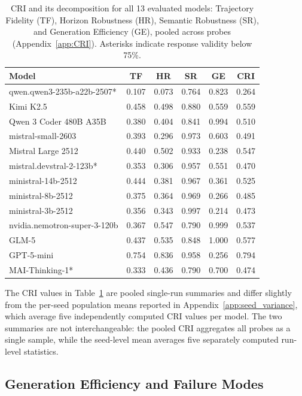 \documentclass{article}
\begin{document}
\begin{table}[!ht]
\centering
\caption{CRI and its decomposition for all 13 evaluated models: Trajectory Fidelity (TF), Horizon Robustness (HR), Semantic Robustness (SR), and Generation Efficiency (GE), pooled across probes (Appendix~\ref{app:CRI}). Asterisks indicate response validity below 75\%.}
\label{tab:cri_decomposition}
\scriptsize
\begin{tabular}{lccccc}
\toprule
\textbf{Model} & \textbf{TF} & \textbf{HR} & \textbf{SR} & \textbf{GE} & \textbf{CRI} \\
\midrule
qwen.qwen3-235b-a22b-2507* & 0.107 & 0.073 & 0.764 & 0.823 & 0.264 \\
Kimi K2.5 & 0.458 & 0.498 & 0.880 & 0.559 & 0.559 \\
Qwen 3 Coder 480B A35B & 0.380 & 0.404 & 0.841 & 0.994 & 0.510 \\
mistral-small-2603 & 0.393 & 0.296 & 0.973 & 0.603 & 0.491 \\
Mistral Large 2512 & 0.440 & 0.502 & 0.933 & 0.238 & 0.547 \\
mistral.devstral-2-123b* & 0.353 & 0.306 & 0.957 & 0.551 & 0.470 \\
ministral-14b-2512 & 0.444 & 0.381 & 0.967 & 0.361 & 0.525 \\
ministral-8b-2512 & 0.375 & 0.364 & 0.969 & 0.266 & 0.485 \\
ministral-3b-2512 & 0.356 & 0.343 & 0.997 & 0.214 & 0.473 \\
nvidia.nemotron-super-3-120b & 0.367 & 0.547 & 0.790 & 0.999 & 0.537 \\
GLM-5 & 0.437 & 0.535 & 0.848 & 1.000 & 0.577 \\
GPT-5-mini & 0.754 & 0.836 & 0.958 & 0.256 & 0.794 \\
MAI-Thinking-1* & 0.333 & 0.436 & 0.790 & 0.700 & 0.474 \\
\bottomrule
\end{tabular}
\end{table}

The CRI values in Table~\ref{tab:cri_decomposition} are pooled single-run summaries and differ slightly from the per-seed population means reported in Appendix~\ref{app:seed_variance}, which average five independently computed CRI values per model. The two summaries are not interchangeable: the pooled CRI aggregates all probes as a single sample, while the seed-level mean averages five separately computed run-level statistics.

\subsection{Generation Efficiency and Failure Modes}
\end{document}

